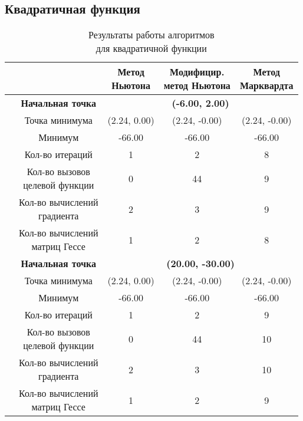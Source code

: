 \subsection{Квадратичная функция}

\begin{table}[H]
        \centering
        \vspace*{-1.5em}
        \caption{Результаты работы алгоритмов\\для квадратичной функции}
        \footnotesize
        \begin{tabular}{|c|c|c|c|c|}
        \hline
        & &\makecell{Метод\\Ньютона} &\makecell{Модифицир.\\метод Ньютона} &\makecell{Метод\\Марквардта} \\
        \hline
	\multirow{12}{*}{\rotatebox[origin=c]{90}{$\varepsilon = 0.01$}}&\textbf{Начальная точка} &\multicolumn{3}{c|}{\textbf{(-6.00, 2.00)}}\\
	\cline{2-5}
	&Точка минимума &(2.24, 0.00) &(2.24, -0.00) &(2.24, -0.00) \\ 
	\cline{2-5}
	&Минимум &-66.00 &-66.00 &-66.00 \\ 
	\cline{2-5}
	&Кол-во итераций &1 &2 &8 \\ 
	\cline{2-5}
	&\makecell{Кол-во вызовов\\целевой функции} &0 &44 &9 \\ 
	\cline{2-5}
	&\makecell{Кол-во вычислений\\градиента} &2 &3 &9 \\ 
	\cline{2-5}
	&\makecell{Кол-во вычислений\\матриц Гессе} &1 &2 &8 \\ 
	\cline{2-5}
\cline{2-5}&\textbf{Начальная точка} &\multicolumn{3}{c|}{\textbf{(20.00, -30.00)}}\\
	\cline{2-5}
	&Точка минимума &(2.24, 0.00) &(2.24, -0.00) &(2.24, -0.00) \\ 
	\cline{2-5}
	&Минимум &-66.00 &-66.00 &-66.00 \\ 
	\cline{2-5}
	&Кол-во итераций &1 &2 &9 \\ 
	\cline{2-5}
	&\makecell{Кол-во вызовов\\целевой функции} &0 &44 &10 \\ 
	\cline{2-5}
	&\makecell{Кол-во вычислений\\градиента} &2 &3 &10 \\ 
	\cline{2-5}
	&\makecell{Кол-во вычислений\\матриц Гессе} &1 &2 &9 \\ 

\end{tabular}
\end{table}
